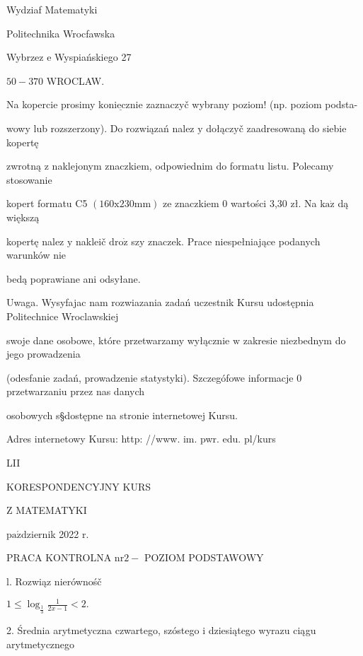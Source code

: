 \documentclass[a4paper,12pt]{article}
\begin{document}
Wydziaf Matematyki

Politechnika Wrocfawska

Wybrzez $\mathrm{e}$ Wyspiańskiego 27

$50-370$ WROCLAW.

Na kopercie prosimy $\underline{\mathrm{k}\mathrm{o}\mathrm{n}\mathrm{i}\mathrm{e}\mathrm{c}\mathrm{z}\mathrm{n}\mathrm{i}\mathrm{e}}$ zaznaczyč wybrany poziom! (np. poziom podsta-

wowy lub rozszerzony). Do rozwiązań nalez $\mathrm{y}$ dołączyč zaadresowaną do siebie kopertę

zwrotną $\mathrm{z}$ naklejonym znaczkiem, odpowiednim do formatu listu. Polecamy stosowanie

kopert formatu C5 $(160\mathrm{x}230\mathrm{m}\mathrm{m})$ ze znaczkiem $0$ wartości 3,30 zł. Na $\mathrm{k}\mathrm{a}\dot{\mathrm{z}}$ dą większą

kopertę nalez $\mathrm{y}$ nakleič $\mathrm{d}\mathrm{r}\mathrm{o}\dot{\mathrm{z}}$ szy znaczek. Prace niespełniające podanych warunków nie

bedą poprawiane ani odsyłane.

Uwaga. Wysyfajac nam rozwiazania zadań uczestnik Kursu udostępnia Politechnice Wroclawskiej

swoje dane osobowe, które przetwarzamy wyłącznie $\mathrm{w}$ zakresie niezbednym do jego prowadzenia

(odesfanie zadań, prowadzenie statystyki). Szczegófowe informacje $0$ przetwarzaniu przez nas danych

osobowych s\S dostępne na stronie internetowej Kursu.

Adres internetowy Kursu: http: //www. im. pwr. edu. pl/kurs







LII

KORESPONDENCYJNY KURS

Z MATEMATYKI

$\mathrm{p}\mathrm{a}\acute{\mathrm{z}}$dziernik 2022 $\mathrm{r}.$

PRACA KONTROLNA $\mathrm{n}\mathrm{r} 2-$ POZIOM PODSTAWOWY

l. Rozwiąz nierównośč

$1\displaystyle \leq\log_{\frac{1}{3}}\frac{1}{2x-1}<2.$

2. Średnia arytmetyczna czwartego, szóstego $\mathrm{i}$ dziesiątego wyrazu ciągu arytmetycznego
\end{document}
